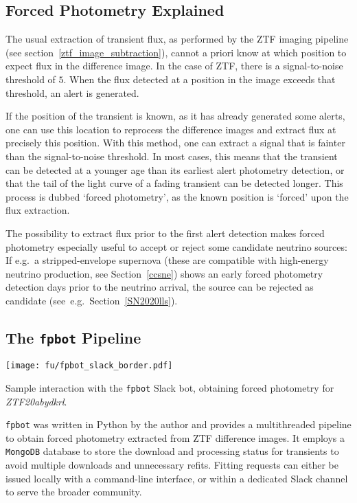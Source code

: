 \subsection{Forced Photometry Explained}
The usual extraction of transient flux, as performed by the ZTF imaging pipeline (see section~\ref{ztf_image_subtraction}), cannot a priori know at which position to expect flux in the difference image. In the case of ZTF, there is a signal-to-noise threshold of $5$. When the flux detected at a position in the image exceeds that threshold, an alert is generated.

If the position of the transient is known, as it has already generated some alerts, one can use this location to reprocess the difference images and extract flux at precisely this position. With this method, one can extract a signal that is fainter than the signal-to-noise threshold. In most cases, this means that the transient can be detected at a younger age than its earliest alert photometry detection, or that the tail of the light curve of a fading transient can be detected longer. This process is dubbed `forced photometry', as the known position is `forced' upon the flux extraction.

The possibility to extract flux prior to the first alert detection makes forced photometry especially useful to accept or reject some candidate neutrino sources: If e.g.\ a stripped-envelope supernova (these are compatible with high-energy neutrino production, see Section~\ref{ccsne}) shows an early forced photometry detection days prior to the neutrino arrival, the source can be rejected as candidate (see~e.g.\ Section~\ref{SN2020lls}).

\subsection{The \texttt{fpbot} Pipeline}
\begin{marginfigure}
    \texttt{[image: fu/fpbot\_slack\_border.pdf]}
    \caption[\texttt{fpbot} Slack bot interaction]{Sample interaction with the \texttt{fpbot} Slack bot, obtaining forced photometry for \textit{ZTF20abydkrl}.}
\end{marginfigure}

\texttt{fpbot} was written in Python by the author and provides a multithreaded pipeline to obtain forced photometry extracted from ZTF difference images. It employs a \texttt{MongoDB} database to store the download and processing status for transients to avoid multiple downloads and unnecessary refits. Fitting requests can either be issued locally with a command-line interface, or within a dedicated Slack channel to serve the broader community.

